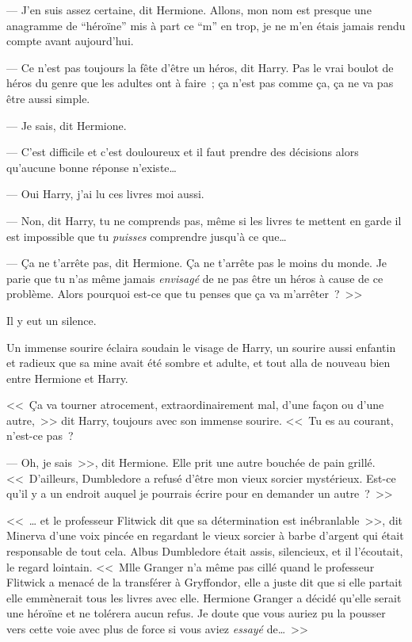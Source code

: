 --- J'en suis assez certaine, dit Hermione. Allons, mon nom est presque une anagramme de “héroïne” mis à part ce “m” en trop, je ne m'en étais jamais rendu compte avant aujourd'hui.

--- Ce n'est pas toujours la fête d'être un héros, dit Harry. Pas le vrai boulot de héros du genre que les adultes ont à faire~; ça n'est pas comme ça, ça ne va pas être aussi simple.

--- Je sais, dit Hermione.

--- C'est difficile et c'est douloureux et il faut prendre des décisions alors qu'aucune bonne réponse n'existe…

--- Oui Harry, j'ai lu ces livres moi aussi.

--- Non, dit Harry, tu ne comprends pas, même si les livres te mettent en garde il est impossible que tu \emph{puisses} comprendre jusqu'à ce que…

--- Ça ne t'arrête pas, dit Hermione. Ça ne t'arrête pas le moins du monde. Je parie que tu n'as même jamais \emph{envisagé} de ne pas être un héros à cause de ce problème. Alors pourquoi est-ce que tu penses que ça va m'arrêter~?~>>

Il y eut un silence.

Un immense sourire éclaira soudain le visage de Harry, un sourire aussi enfantin et radieux que sa mine avait été sombre et adulte, et tout alla de nouveau bien entre Hermione et Harry.

<<~Ça va tourner atrocement, extraordinairement mal, d'une façon ou d'une autre,~>> dit Harry, toujours avec son immense sourire. <<~Tu es au courant, n'est-ce pas~?

--- Oh, je sais~>>, dit Hermione. Elle prit une autre bouchée de pain grillé. <<~D'ailleurs, Dumbledore a refusé d'être mon vieux sorcier mystérieux. Est-ce qu'il y a un endroit auquel je pourrais écrire pour en demander un autre~?~>>


<<~… et le professeur Flitwick dit que sa détermination est inébranlable~>>, dit Minerva d'une voix pincée en regardant le vieux sorcier à barbe d'argent qui était responsable de tout cela. Albus Dumbledore était assis, silencieux, et il l'écoutait, le regard lointain. <<~Mlle Granger n'a même pas cillé quand le professeur Flitwick a menacé de la transférer à Gryffondor, elle a juste dit que si elle partait elle emmènerait tous les livres avec elle. Hermione Granger a décidé qu'elle serait une héroïne et ne tolérera aucun refus. Je doute que vous auriez pu la pousser vers cette voie avec plus de force si vous aviez \emph{essayé} de…~>>

